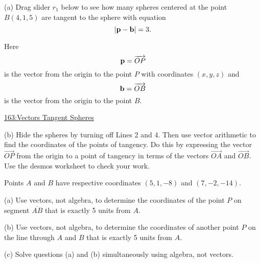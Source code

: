 \documentclass{ximera}
\begin{document}
\begin{question}  \label{Qdf4r4r5443}
(a) Drag slider $r_1$ below to see how many spheres centered at the point $B(4,1,5)$ are tangent to the sphere with equation
\[
        | {\bf p} - {\bf b} | = 3 .
\]


Here
\[
     {\bf p} = \overrightarrow{OP}
\]
is the vector from the origin to the point $P$ with coordinates $(x,y,z)$ and 
\[
   {\bf b} = \overrightarrow{OB}
\]
is the vector from the origin to the point $B$.



\begin{onlineOnly}
    \begin{center}
\end{center}
\end{onlineOnly}

\href{https://www.desmos.com/3d/4lmtlrfpms}{163:Vectors Tangent Spheres}

(b) Hide the spheres by turning off Lines 2 and 4. Then use vector arithmetic to find the coordinates of the points of tangency. Do this by expressing the vector $\overrightarrow{OP}$ from the origin to a point of tangency in terms of the vectors $\overrightarrow{OA}$ and $\overrightarrow{OB}$. Use the desmos worksheet to check your work.

\end{question}








\begin{question} \label{Q45323240:Vectors}
Points $A$ and $B$ have respective coordinates $(5,1,-8)$ and $(7,-2,-14)$. 

(a) Use vectors, not algebra, to determine the coordinates of the point $P$ on segment $\overline{AB}$ that is exactly 5 units from $A$.

(b) Use vectors, not algebra, to determine the coordinates of another point $P$ on the line through $A$ and $B$ that is exactly 5 units from $A$.

(c) Solve questions (a) and (b) simultaneously using algebra, not vectors.

\end{question}
\end{document}
